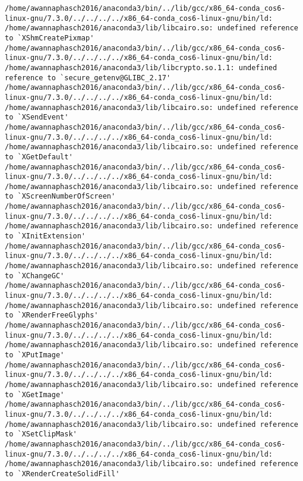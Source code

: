 \documentclass[11pt]{article}
\begin{document}
\begin{enumerate}
\begin{enumerate}
\begin{verbatim}
/home/awannaphasch2016/anaconda3/bin/../lib/gcc/x86_64-conda_cos6-linux-gnu/7.3.0/../../../../x86_64-conda_cos6-linux-gnu/bin/ld: /home/awannaphasch2016/anaconda3/lib/libcairo.so: undefined reference to `XShmCreatePixmap'
/home/awannaphasch2016/anaconda3/bin/../lib/gcc/x86_64-conda_cos6-linux-gnu/7.3.0/../../../../x86_64-conda_cos6-linux-gnu/bin/ld: /home/awannaphasch2016/anaconda3/lib/libcrypto.so.1.1: undefined reference to `secure_getenv@GLIBC_2.17'
/home/awannaphasch2016/anaconda3/bin/../lib/gcc/x86_64-conda_cos6-linux-gnu/7.3.0/../../../../x86_64-conda_cos6-linux-gnu/bin/ld: /home/awannaphasch2016/anaconda3/lib/libcairo.so: undefined reference to `XSendEvent'
/home/awannaphasch2016/anaconda3/bin/../lib/gcc/x86_64-conda_cos6-linux-gnu/7.3.0/../../../../x86_64-conda_cos6-linux-gnu/bin/ld: /home/awannaphasch2016/anaconda3/lib/libcairo.so: undefined reference to `XGetDefault'
/home/awannaphasch2016/anaconda3/bin/../lib/gcc/x86_64-conda_cos6-linux-gnu/7.3.0/../../../../x86_64-conda_cos6-linux-gnu/bin/ld: /home/awannaphasch2016/anaconda3/lib/libcairo.so: undefined reference to `XScreenNumberOfScreen'
/home/awannaphasch2016/anaconda3/bin/../lib/gcc/x86_64-conda_cos6-linux-gnu/7.3.0/../../../../x86_64-conda_cos6-linux-gnu/bin/ld: /home/awannaphasch2016/anaconda3/lib/libcairo.so: undefined reference to `XInitExtension'
/home/awannaphasch2016/anaconda3/bin/../lib/gcc/x86_64-conda_cos6-linux-gnu/7.3.0/../../../../x86_64-conda_cos6-linux-gnu/bin/ld: /home/awannaphasch2016/anaconda3/lib/libcairo.so: undefined reference to `XChangeGC'
/home/awannaphasch2016/anaconda3/bin/../lib/gcc/x86_64-conda_cos6-linux-gnu/7.3.0/../../../../x86_64-conda_cos6-linux-gnu/bin/ld: /home/awannaphasch2016/anaconda3/lib/libcairo.so: undefined reference to `XRenderFreeGlyphs'
/home/awannaphasch2016/anaconda3/bin/../lib/gcc/x86_64-conda_cos6-linux-gnu/7.3.0/../../../../x86_64-conda_cos6-linux-gnu/bin/ld: /home/awannaphasch2016/anaconda3/lib/libcairo.so: undefined reference to `XPutImage'
/home/awannaphasch2016/anaconda3/bin/../lib/gcc/x86_64-conda_cos6-linux-gnu/7.3.0/../../../../x86_64-conda_cos6-linux-gnu/bin/ld: /home/awannaphasch2016/anaconda3/lib/libcairo.so: undefined reference to `XGetImage'
/home/awannaphasch2016/anaconda3/bin/../lib/gcc/x86_64-conda_cos6-linux-gnu/7.3.0/../../../../x86_64-conda_cos6-linux-gnu/bin/ld: /home/awannaphasch2016/anaconda3/lib/libcairo.so: undefined reference to `XSetClipMask'
/home/awannaphasch2016/anaconda3/bin/../lib/gcc/x86_64-conda_cos6-linux-gnu/7.3.0/../../../../x86_64-conda_cos6-linux-gnu/bin/ld: /home/awannaphasch2016/anaconda3/lib/libcairo.so: undefined reference to `XRenderCreateSolidFill'

\end{verbatim}
\end{enumerate}
\end{enumerate}
\end{document}
